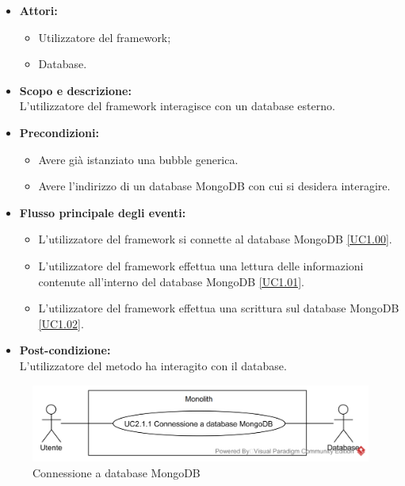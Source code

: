 \begin{itemize}
	\item \textbf{Attori:}
	\begin{itemize}
		\item Utilizzatore del framework;
		\item Database.
	\end{itemize}
	\item \textbf{Scopo e descrizione:} 
	\\L'utilizzatore del framework interagisce con un database  esterno.
	\item \textbf{Precondizioni:}
	\begin{itemize}
		\item Avere già istanziato una bubble generica.
		\item Avere l'indirizzo di un database MongoDB con cui si desidera interagire.
	\end{itemize}
	\item \textbf{Flusso principale degli eventi:}
	\begin{itemize}
		\item L'utilizzatore del framework si connette al database MongoDB \ref{UC1.00}.
		\item L'utilizzatore del framework effettua una lettura delle informazioni contenute all'interno del database MongoDB \ref{UC1.01}.
		\item L'utilizzatore del framework effettua una scrittura sul database MongoDB \ref{UC1.02}.
	\end{itemize}
	\item \textbf{Post-condizione:}
	\\L'utilizzatore del metodo ha interagito con il database.
\end{itemize}

\begin{samepage}
\nopagebreak
\begin{figure}[H]
	\centering
	\includegraphics[width=15cm]{../../documenti/AnalisiDeiRequisiti/Diagrammi_img/usecase/uc1_00.png}
	\caption{\UCCCaption{} Connessione a database MongoDB}
\end{figure}
\end{samepage}

